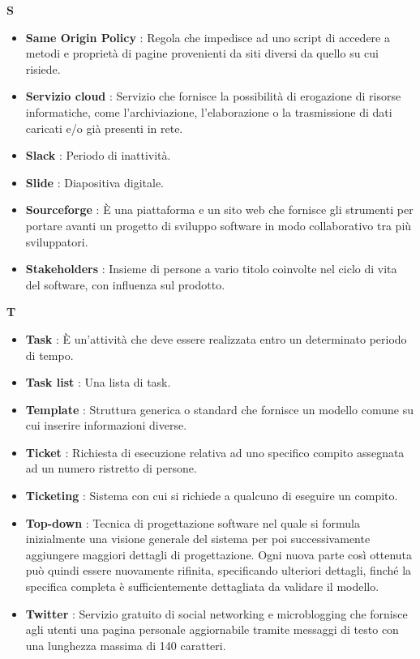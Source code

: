 \newpage
{\huge \textbf{S}}
\begin{flushleft}
\begin{itemize}[label={}]
\item \textbf{Same Origin Policy} : Regola che impedisce ad uno script di accedere a metodi e proprietà di pagine provenienti da siti diversi da quello su cui risiede.
\item \textbf{Servizio cloud} : Servizio che fornisce la possibilità di erogazione di risorse informatiche, come l'archiviazione, l'elaborazione o la trasmissione di dati caricati e/o già presenti in rete.
\item \textbf{Slack} : Periodo di inattività.
\item \textbf{Slide} : Diapositiva digitale.
\item \textbf{Sourceforge} : È una piattaforma e un sito web che fornisce gli strumenti per portare avanti un progetto di sviluppo software in modo collaborativo tra più sviluppatori.
\item \textbf{Stakeholders} : Insieme di persone a vario titolo coinvolte nel ciclo di vita del software, con influenza sul prodotto.
\end{itemize}
\end{flushleft}
\newpage
{\huge \textbf{T}}
\begin{flushleft}
\begin{itemize}[label={}]
\item \textbf{Task} : È un'attività che deve essere realizzata entro un determinato periodo di tempo.
\item \textbf{Task list} : Una lista di task.
\item \textbf{Template} : Struttura generica o standard che fornisce un modello comune su cui inserire informazioni diverse.
\item \textbf{Ticket} : Richiesta di esecuzione relativa ad uno specifico compito assegnata ad un numero ristretto di persone.
\item \textbf{Ticketing} : Sistema con cui si richiede a qualcuno di eseguire un compito.
\item \textbf{Top-down} : Tecnica di progettazione software nel quale si formula inizialmente una visione generale del sistema per poi successivamente aggiungere maggiori dettagli di progettazione. Ogni nuova parte così ottenuta può quindi essere nuovamente rifinita, specificando ulteriori dettagli, finché la specifica completa è sufficientemente dettagliata da validare il modello.
\item \textbf{Twitter} : Servizio gratuito di social networking e microblogging che fornisce agli utenti una pagina personale aggiornabile tramite messaggi di testo con una lunghezza massima di 140 caratteri.
\end{itemize}
\end{flushleft}
